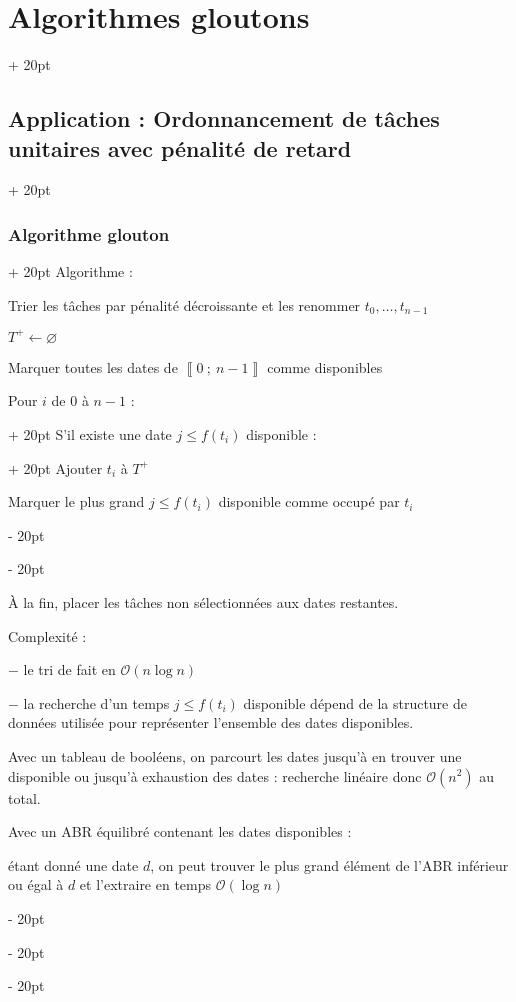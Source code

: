 \documentclass[a4paper, 12pt, twoside]{article}
\newcommand{\nset}[2]{\left\llbracket #1\ ;\ #2 \right\rrbracket}
\renewcommand{\le}{\leqslant}
\newcommand{\ind}[1][20pt]{\advance\leftskip + #1}
\newcommand{\deind}[1][20pt]{\advance\leftskip - #1}
\newenvironment{indt}[2][20pt]{#2 \par \ind[#1]}{\par \deind} %
\begin{document}
\begin{indt}{\section{Algorithmes gloutons}}
\begin{indt}{\subsection{Application : Ordonnancement de tâches unitaires avec pénalité de retard}}
\begin{indt}{\subsubsection{Algorithme glouton}}
                Algorithme :
                
                \begin{pseudocode}
                    Trier les tâches par pénalité décroissante et les renommer $t_0, \ldots, t_{n - 1}$
                    
                    $T^+ \leftarrow \varnothing$
                    
                    Marquer toutes les dates de $\nset{0}{n - 1}$ comme disponibles
                    
                    \begin{indt}{Pour $i$ de 0 à $n - 1$ :}
                        \begin{indt}{S'il existe une date $j \le f(t_i)$ disponible :}
                            Ajouter $t_i$ à $T^+$
                            
                            Marquer le plus grand $j \le f(t_i)$ disponible comme occupé par $t_i$
                        \end{indt}
                    \end{indt}
                    
                    \vspace{6pt}
                    
                    \`A la fin, placer les tâches non sélectionnées aux dates restantes.
                \end{pseudocode}
                
                \vspace{12pt}
                
                Complexité :
                
                $-$ le tri de fait en $\mathcal O(n\log n)$
                
                $-$ la recherche d'un temps $j \le f(t_i)$ disponible dépend de la structure de données utilisée pour représenter l'ensemble des dates disponibles.
                
                Avec un tableau de booléens, on parcourt les dates jusqu'à en trouver une disponible ou jusqu'à exhaustion des dates : recherche linéaire donc $\mathcal O(n^2)$ au total.
                
                Avec un ABR équilibré contenant les dates disponibles :
                
                 étant donné une date $d$, on peut trouver le plus grand élément de l'ABR inférieur ou égal à $d$ et l'extraire en temps $\mathcal O(\log n)$
                

\end{indt}
\end{indt}
\end{indt}
\end{document}
